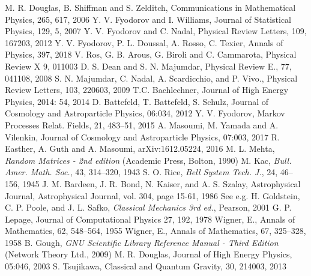 \documentclass[12pt]{article}
\begin{document}
\begin{thebibliography}{99}
 M. R. Douglas, B. Shiffman and S. Zelditch, Communications in Mathematical Physics, 265, 617, 2006 
 Y. V. Fyodorov and I. Williams, Journal of Statistical Physics, 129, 5, 2007
 Y. V. Fyodorov and C. Nadal, Physical Review Letters, 109, 167203, 2012
 Y. V. Fyodorov, P. L. Doussal, A. Rosso, C. Texier, Annals of Physics, 397, 2018
  V. Ros, G. B. Arous, G. Biroli and C. Cammarota, Physical Review X 9, 011003
 D. S. Dean and S. N. Majumdar, Physical Review E., 77, 041108, 2008
 S. N. Majumdar, C. Nadal, A. Scardicchio, and P. Vivo., Physical Review Letters, 103, 220603, 2009
 T.C. Bachlechner, Journal of High Energy Physics, 2014: 54, 2014
 D. Battefeld, T. Battefeld, S. Schulz, Journal of Cosmology and Astroparticle Physics, 06:034, 2012
 Y. V. Fyodorov, Markov Processes Relat. Fields, 21, 483--51, 2015
 A. Masoumi, M. Yamada and A. Vilenkin, Journal of Cosmology and Astroparticle Physics, 07:003, 2017
 R. Easther, A. Guth and A. Masoumi, arXiv:1612.05224, 2016
 M. L. Mehta, \emph{Random Matrices - 2nd edition} (Academic Press, Bolton, 1990)
 M. Kac, \emph{Bull. Amer. Math. Soc.}, 43, 314–320, 1943
  S. O. Rice, \emph{Bell System Tech. J.}, 24, 46--156, 1945
 J. M. Bardeen, J. R. Bond, N. Kaiser, and A. S. Szalay, Astrophysical Journal, Astrophysical Journal, vol. 304, page 15-61, 1986
 See e.g. H. Goldstein, C. P. Poole, and J. L. Safko, \emph{Classical Mechanics 3rd ed.}, Pearson, 2001
 G. P. Lepage, Journal of Computational Physics 27, 192, 1978
 Wigner, E., Annals of Mathematics, 62, 548--564, 1955
 Wigner, E., Annals of Mathematics, 67, 325--328, 1958
 B. Gough, \emph{GNU Scientific Library Reference Manual - Third Edition} (Network Theory Ltd., 2009)
 M. R. Douglas, Journal of High Energy Physics, 05:046, 2003
 S. Tsujikawa, Classical and Quantum Gravity, 30, 214003, 2013
\end{thebibliography}
\end{document}
